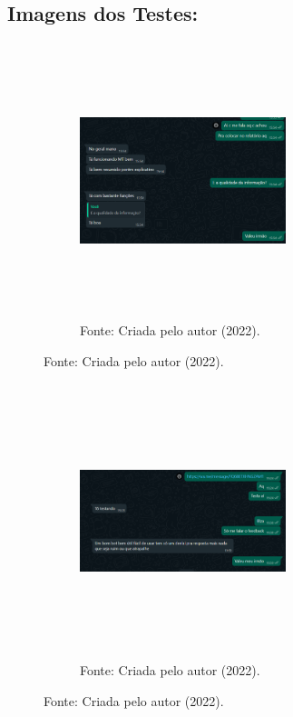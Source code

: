 \begin{itemize}
\subsection{Imagens dos Testes:}

\begin{figure}[!htb]
\centering
\captionsetup[subfigure]{labelformat=empty}
\caption{``Teste 1''}
\begin{subfigure}{.5\textwidth}
\centering
\includegraphics[width=6cm,height=8cm]{Bot/Partes/Imagens/teste 1.png}
\caption{Fonte: Criada pelo autor (2022).}
\end{subfigure}%
\end{figure}

\begin{figure}[!htb]
\centering
\captionsetup[subfigure]{labelformat=empty}
\caption{``Teste 2''}
\begin{subfigure}{.5\textwidth}
\centering
\includegraphics[width=6cm,height=8cm]{Bot/Partes/Imagens/teste 2.png}
\caption{Fonte: Criada pelo autor (2022).}
\end{subfigure}%
\end{figure}


\end{itemize}
